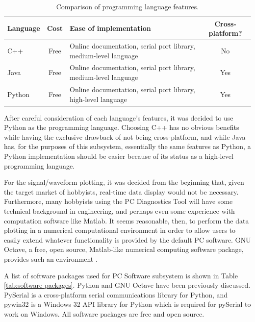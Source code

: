 \begin{table}[bhp]
\begin{tabular}{l | c | p{6cm} | c}
	Language & Cost & Ease of implementation & Cross-platform? \\ 
	\hline
	C++ & Free & Online documentation, serial port library, medium-level language \cite{web:cpptut}\cite{web:cppserial} & No \\ 
	\hline
	Java & Free & Online documentation, serial port library, medium-level language \cite{web:javaapi}\cite{web:javaserial} & Yes \\
	\hline
	Python & Free & Online documentation, serial port library, high-level language \cite{web:pydoc}\cite{web:pyserial} & Yes \\
\end{tabular}
\caption[Language features]{Comparison of programming language features.}
\label{tab:languages features}
\end{table}


After careful consideration of each language's features, it was decided to use Python as 
the programming language. Choosing C++ has no obvious benefits while having the exclusive 
drawback of not being cross-platform, and while Java has, for the purposes of this subsystem, 
essentially the same features as Python, a Python implementation should be easier because of 
its status as a high-level programming language.

For the signal/waveform plotting, it was decided from the beginning that, given the target 
market of hobbyists, real-time data display would not be necessary. Furthermore, many 
hobbyists using the PC Diagnostics Tool will have some technical background in engineering, 
and perhaps even some experience with computation software like Matlab. It seems reasonable, 
then, to perform the data plotting in a numerical computational environment in order to 
allow users to easily extend whatever functionality is provided by the default PC software. 
GNU Octave, a free, open source, Matlab-like numerical computing software package, provides 
such an environment \cite{web:octave}.

A list of software packages used for PC Software subsystem is shown in Table \ref{tab:software packages}. 
Python and GNU Octave have been previously discussed. PySerial is a cross-platform serial 
communications library for Python, and pywin32 is a Windows 32 API library for Python which is 
required for pySerial to work on Windows. All software packages are free and open source.



